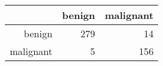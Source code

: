 \begin{tabular}{rrr}
  \hline
 & benign & malignant \\ 
  \hline
benign & 279 &  14 \\ 
  malignant &   5 & 156 \\ 
   \hline
\end{tabular}
